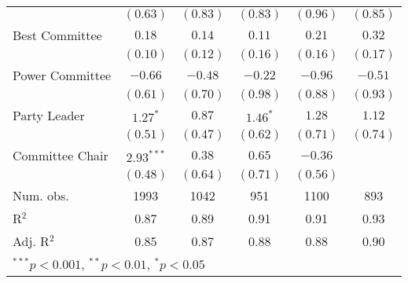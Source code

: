 \documentclass[12pt]{article}
\begin{document}
\begin{table}
\begin{center}
\begin{tabular}{l c c c c c }
			& $(0.63)$      & $(0.83)$     & $(0.83)$      & $(0.96)$      & $(0.85)$     \\
			Best Committee         & $0.18$        & $0.14$       & $0.11$        & $0.21$        & $0.32$       \\
			& $(0.10)$      & $(0.12)$     & $(0.16)$      & $(0.16)$      & $(0.17)$     \\
			Power Committee        & $-0.66$       & $-0.48$      & $-0.22$       & $-0.96$       & $-0.51$      \\
			& $(0.61)$      & $(0.70)$     & $(0.98)$      & $(0.88)$      & $(0.93)$     \\
			Party Leader                  & $1.27^{*}$    & $0.87$       & $1.46^{*}$    & $1.28$        & $1.12$       \\
			& $(0.51)$      & $(0.47)$     & $(0.62)$      & $(0.71)$      & $(0.74)$     \\
			Committee Chair                   & $2.93^{***}$  & $0.38$       & $0.65$        & $-0.36$       &              \\
			& $(0.48)$      & $(0.64)$     & $(0.71)$      & $(0.56)$      &              \\
			\hline
			Num. obs.               & 1993          & 1042         & 951           & 1100          & 893          \\
			R$^2$      & 0.87          & 0.89         & 0.91          & 0.91          & 0.93         \\
			Adj. R$^2$ & 0.85          & 0.87         & 0.88          & 0.88          & 0.90         \\
			\hline
			\multicolumn{6}{l}{\scriptsize{$^{***}p<0.001$, $^{**}p<0.01$, $^*p<0.05$}}
		\end{tabular}
	\end{center}
\end{table}
\end{document}
